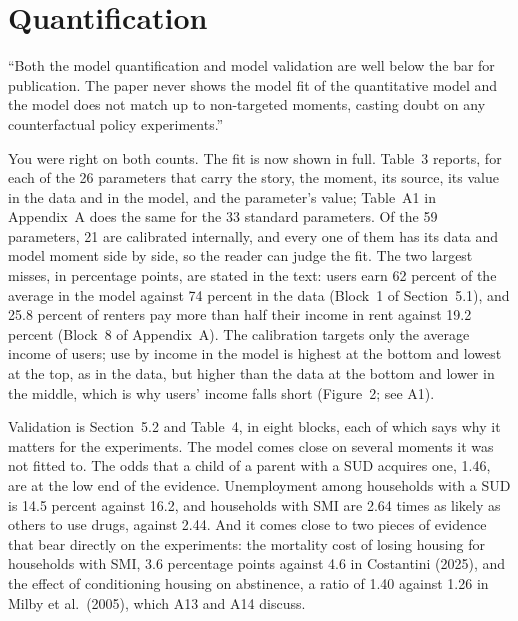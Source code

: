 \documentclass[11pt]{article}
\begin{document}
\section*{Quantification}

\begin{referee}
``Both the model quantification and model validation are well below the bar for
publication. The paper never shows the model fit of the quantitative model and
the model does not match up to non-targeted moments, casting doubt on any
counterfactual policy experiments.''
\end{referee}
\begin{response}
\concede You were right on both counts. The fit is now shown in full. Table~3
reports, for each of the 26 parameters that carry the story, the moment, its
source, its value in the data and in the model, and the parameter's value;
Table~A1 in Appendix~A does the same for the 33 standard parameters. Of the 59
parameters, 21 are calibrated internally, and every one of them has its data and
model moment side by side, so the reader can judge the fit. The two largest misses,
in percentage points, are stated in the text: users earn 62 percent of the average
in the model against 74 percent in the data (Block~1 of Section~5.1), and 25.8
percent of renters pay more than half their income in rent against 19.2 percent
(Block~8 of Appendix~A). The calibration targets only the average income of users;
use by income in the model is highest at the bottom and lowest at the top, as in the
data, but higher than the data at the bottom and lower in the middle, which is why
users' income falls short (Figure~2; see A1).

Validation is Section~5.2 and Table~4, in eight blocks, each of which says why it
matters for the experiments. The model comes close on several moments it was not
fitted to. The odds that a child of a parent with a SUD acquires one, 1.46, are at
the low end of the evidence. Unemployment among households with a SUD is 14.5
percent against 16.2, and households with SMI are 2.64 times as likely as others to
use drugs, against 2.44. And it comes close to two pieces of evidence that bear
directly on the experiments: the mortality cost of losing housing for households
with SMI, 3.6 percentage points against 4.6 in Costantini (2025), and the effect of
conditioning housing on abstinence, a ratio of 1.40 against 1.26 in Milby et al.\
(2005), which A13 and A14 discuss.


\end{response}
\end{document}
